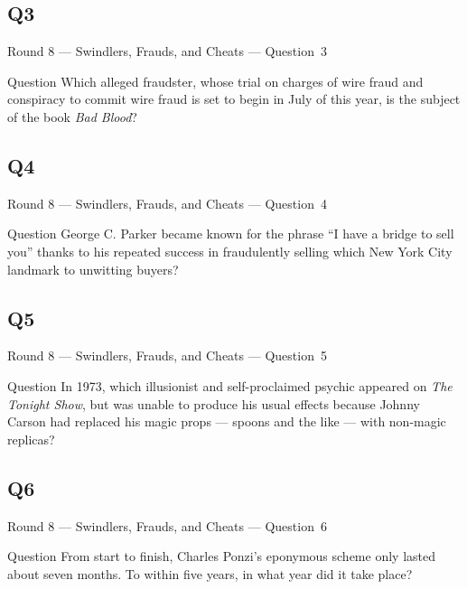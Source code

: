 \documentclass[11pt]{beamer}
\begin{document}
\subsection*{Q3}
\begin{frame}[t]{Round 8 --- Swindlers, Frauds, and Cheats --- \mbox{Question 3}}
\vspace{-0.5em}
\begin{block}{Question}
Which alleged fraudster, whose trial on charges of wire fraud and conspiracy to commit wire fraud is set to begin in July of this year, is the subject of the book \emph{Bad Blood}?
\end{block}
\end{frame}
\subsection*{Q4}
\begin{frame}[t]{Round 8 --- Swindlers, Frauds, and Cheats --- \mbox{Question 4}}
\vspace{-0.5em}
\begin{block}{Question}
George C. Parker became known for the phrase ``I have a bridge to sell you'' thanks to his repeated success in fraudulently selling which New York City landmark to unwitting buyers?
\end{block}
\end{frame}
\subsection*{Q5}
\begin{frame}[t]{Round 8 --- Swindlers, Frauds, and Cheats --- \mbox{Question 5}}
\vspace{-0.5em}
\begin{block}{Question}
In 1973, which illusionist and self-proclaimed psychic appeared on \emph{The Tonight Show}, but was unable to produce his usual effects because Johnny Carson had replaced his magic props --- spoons and the like --- with non-magic replicas?
\end{block}
\end{frame}
\subsection*{Q6}
\begin{frame}[t]{Round 8 --- Swindlers, Frauds, and Cheats --- \mbox{Question 6}}
\vspace{-0.5em}
\begin{block}{Question}
From start to finish, Charles Ponzi's eponymous scheme only lasted about seven months. To within five years, in what year did it take place?
\end{block}
\end{frame}
\end{document}

